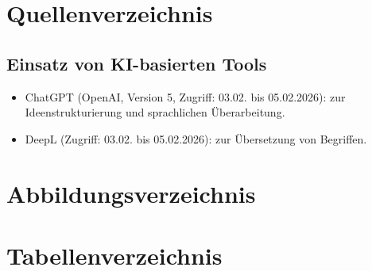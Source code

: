 \section{Quellenverzeichnis}

\printbibliography[heading=none]

\vspace{1cm}

\subsection{Einsatz von KI-basierten Tools}
\begin{itemize}
  \item ChatGPT (OpenAI, Version 5, Zugriff: 03.02. bis 05.02.2026): zur Ideenstrukturierung und sprachlichen Überarbeitung.
  \item DeepL (Zugriff: 03.02. bis 05.02.2026): zur Übersetzung von Begriffen.
\end{itemize}

\cleardoublepage
\section{Abbildungsverzeichnis}
\listoffigures

\cleardoublepage
\section{Tabellenverzeichnis}
\listoftables